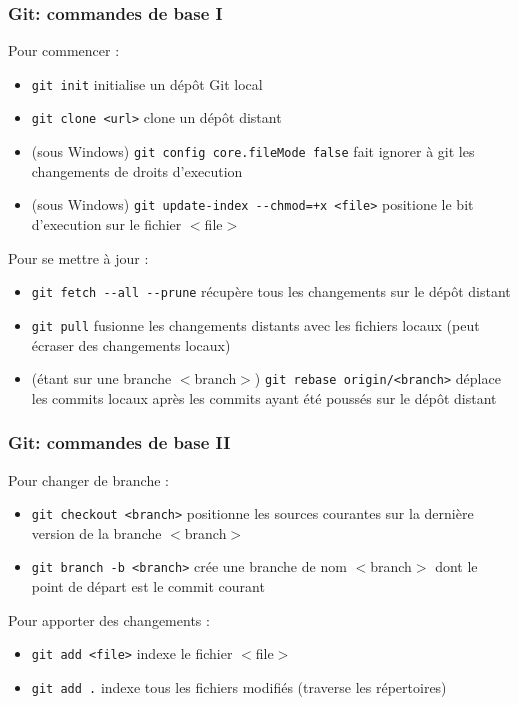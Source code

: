 \begin{frame}
	\frametitle{Git: commandes de base I}
	Pour commencer :
    \begin{itemize}
      \item {\lstinline[basicstyle=\ttfamily\color{blue}]|git init|} initialise un d\'ep\^{o}t Git local
      \item {\lstinline[basicstyle=\ttfamily\color{blue}]|git clone <url>|} clone un d\'ep\^{o}t distant
	  \item (sous Windows) {\lstinline[basicstyle=\ttfamily\color{blue}]|git config core.fileMode false|} fait ignorer \`a git les changements de droits d'execution
	  \item (sous Windows) {\lstinline[basicstyle=\ttfamily\color{blue}]|git update-index --chmod=+x <file>|} positione le bit d'execution sur le fichier $<$file$>$
    \end{itemize}
	Pour se mettre \`a jour :
	\begin{itemize}
      \item {\lstinline[basicstyle=\ttfamily\color{blue}]|git fetch --all --prune|} r\'ecup\`ere tous les changements sur le d\'ep\^{o}t distant
      \item {\lstinline[basicstyle=\ttfamily\color{blue}]|git pull|} fusionne les changements distants avec les fichiers locaux (peut \'ecraser des changements locaux)
	  \item (\'etant sur une branche $<$branch$>$) {\lstinline[basicstyle=\ttfamily\color{blue}]|git rebase origin/<branch>|} d\'eplace les commits locaux apr\`es les commits ayant \'et\'e pouss\'es sur le d\'ep\^{o}t distant
    \end{itemize}
\end{frame}

\begin{frame}
	\frametitle{Git: commandes de base II}
	Pour changer de branche :
	\begin{itemize}
      \item {\lstinline[basicstyle=\ttfamily\color{blue}]|git checkout <branch>|} positionne les sources courantes sur la derni\`ere version de la branche $<$branch$>$
      \item {\lstinline[basicstyle=\ttfamily\color{blue}]|git branch -b <branch>|} cr\'ee une branche de nom $<$branch$>$ dont le point de d\'epart est le commit courant
    \end{itemize}
	Pour apporter des changements :
	\begin{itemize}
      \item {\lstinline[basicstyle=\ttfamily\color{blue}]|git add <file>|} indexe le fichier $<$file$>$
      \item {\lstinline[basicstyle=\ttfamily\color{blue}]|git add .|} indexe tous les fichiers modifi\'es (traverse les r\'epertoires)
    \end{itemize}
\end{frame}

